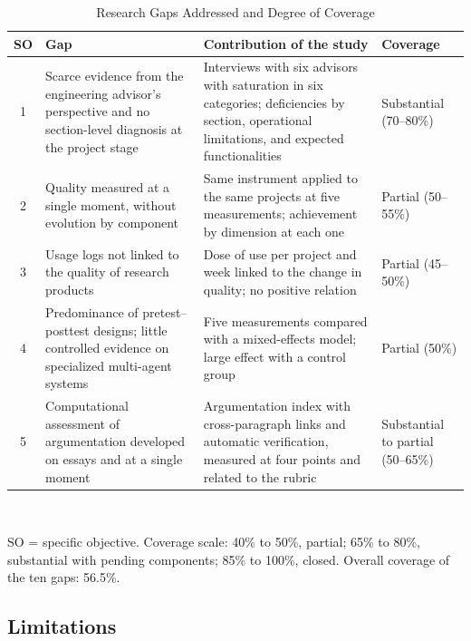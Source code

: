 \documentclass[journal]{IEEEtran}
\begin{document}
\begin{table}[!t]
\caption{Research Gaps Addressed and Degree of Coverage}
\label{tab:gaps}
\centering
\footnotesize
\begin{tabular}{cL{2.7cm}L{2.9cm}L{1.25cm}}
\toprule
SO & Gap & Contribution of the study & Coverage \\
 & Scarce evidence from the engineering advisor's perspective and no section-level diagnosis at the project stage & Interviews with six advisors with saturation in six categories; deficiencies by section, operational limitations, and expected functionalities & Substantial (70--80\%) \\
2 & Quality measured at a single moment, without evolution by component & Same instrument applied to the same projects at five measurements; achievement by dimension at each one & Partial (50--55\%) \\
3 & Usage logs not linked to the quality of research products & Dose of use per project and week linked to the change in quality; no positive relation & Partial (45--50\%) \\
4 & Predominance of pretest--posttest designs; little controlled evidence on specialized multi-agent systems & Five measurements compared with a mixed-effects model; large effect with a control group & Partial (50\%) \\
5 & Computational assessment of argumentation developed on essays and at a single moment & Argumentation index with cross-paragraph links and automatic verification, measured at four points and related to the rubric & Substantial to partial (50--65\%) \\
\bottomrule
\end{tabular}
\\[2pt]
\raggedright\scriptsize SO = specific objective. Coverage scale: 40\% to 50\%, partial; 65\% to 80\%, substantial with pending components; 85\% to 100\%, closed. Overall coverage of the ten gaps: 56.5\%.
\end{table}

\subsection{Limitations}
\end{document}
